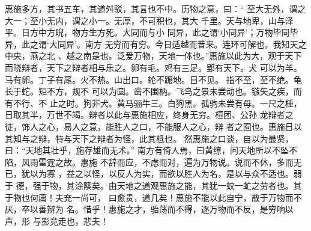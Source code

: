 \documentclass[12pt,UTF8]{ctexbook}
\begin{document}
惠施多方，其书五车，其道舛驳，其言也不中。历物之意，曰：“ 至大无外，谓之大一；至小无内，谓之小一。无厚，不可积也，其大 千里。天与地卑，山与泽平。日方中方睨，物方生方死。大同而与小 同异，此之谓‘小同异’；万物毕同毕异，此之谓‘大同异’。南方 无穷而有穷。今日适越而昔来。连环可解也。我知天之中央，燕之北 、越之南是也。泛爱万物，天地一体也。”惠施以此为大，观于天下 而晓辩者，天下之辩者相与乐之。卵有毛。鸡有三足。郢有天下。犬 可以为羊。马有卵。丁子有尾。火不热。山出口。轮不蹍地。目不见。 指不至，至不绝。龟长于蛇。矩不方，规不 可以为圆。凿不围枘。飞鸟之景未尝动也。镞矢之疾，而有不行、不 止之时。狗非犬。黄马骊牛三。白狗黑。孤驹未尝有母。一尺之棰， 日取其半，万世不竭。辩者以此与惠施相应，终身无穷。桓团、公孙 龙辩者之徒，饰人之心，易人之意，能胜人之口，不能服人之心，辩 者之囿也。惠施日以其知与之辩，特与天下之辩者为怪，此其柢也。 然惠施之口谈，自以为最贤，曰：“天地其壮乎，施存雄而无术。” 南方有倚人焉，曰黄缭，问天地所以不坠不陷，风雨雷霆之故。惠施 不辞而应，不虑而对，遍为万物说。说而不休，多而无已，犹以为寡 ，益之以怪，以反人为实，而欲以胜人为名，是以与众不适也。弱于 德，强于物，其涂隩矣。由天地之道观惠施之能，其犹一蚊一虻之劳者也。其于物也何庸！夫充一尚可， 曰愈贵，道几矣！惠施不能以此自宁，散于万物而不厌，卒以善辩为 名。惜乎！惠施之才，骀荡而不得，逐万物而不反，是穷响以声，形 与影竞走也，悲夫！
\end{document}
